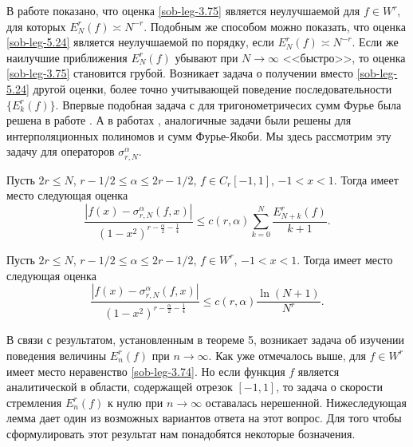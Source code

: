 В работе \cite{Haar-Tcheb-Shar15} показано, что оценка \eqref{sob-leg-3.75}  является неулучшаемой для  $f\in W^r$, для которых $E^{r}_{N}(f)\asymp N^{-r}$. Подобным же способом можно показать, что оценка  \eqref{sob-leg-5.24} является неулучшаемой по порядку, если $E^{r}_{N}(f)\asymp N^{-r}$.   Если же  наилучшие приближения  $E^{r}_{N}(f)$ убывают при $N\to\infty$ <<быстро>>, то оценка \eqref{sob-leg-3.75} становится грубой. Возникает задача о получении вместо \eqref{sob-leg-5.24} другой оценки, более точно учитывающей поведение последовательности  $\{E^{r}_{k}(f)\}$. Впервые подобная задача с для тригонометричесих сумм Фурье была решена в работе \cite{sob-leg-OSK}. А в работах \cite{sob-leg-sharap1}, \cite{sob-leg-sharap2} аналогичные задачи были решены для интерполяционных полиномов и сумм Фурье-Якоби. Мы здесь рассмотрим  эту задачу  для операторов $\sigma_{r,N}^\alpha$.

\begin{theorem} Пусть $2r\le N$, $r-1/2\le \alpha\le 2r-1/2$, $f\in C_r[-1,1]$, $-1<x<1$. Тогда имеет место следующая оценка
\begin{equation}\label{sob-leg-5.25}
 \frac{|f(x)-\sigma_{r,N}^\alpha(f,x)|}
{(1-x^2)^{r-\frac{\alpha}{2}-\frac14}}\le c(r,\alpha)\sum_{k=0}^N\frac{E_{N+k}^r(f)}{k+1}.
 \end{equation}
\end{theorem}

\begin{corollary} Пусть $2r\le N$, $r-1/2\le \alpha\le 2r-1/2$, $f\in W^r$, $-1<x<1$. Тогда имеет место следующая оценка
\begin{equation}\label{sob-leg-5.31}
 \frac{|f(x)-\sigma_{r,N}^\alpha(f,x)|}
{(1-x^2)^{r-\frac{\alpha}{2}-\frac14}}\le c(r,\alpha)\frac{\ln(N+1)}{N^r}.
 \end{equation}
\end{corollary}

В связи с результатом, установленным в теореме 5, возникает задача об изучении поведения величины $E_{n}^r(f)$ при $n\to\infty$. Как уже отмечалось выше, для $f\in W^r$ имеет место неравенство \eqref{sob-leg-3.74}. Но если функция $f$ является аналитической в области, содержащей отрезок $[-1,1]$, то задача о скорости стремления $E_{n}^r(f)$ к нулю при $n\to\infty$ оставалась нерешенной. Нижеследующая лемма дает один из возможных вариантов ответа на этот вопрос. Для того чтобы сформулировать этот результат нам понадобятся некоторые бозначения.

